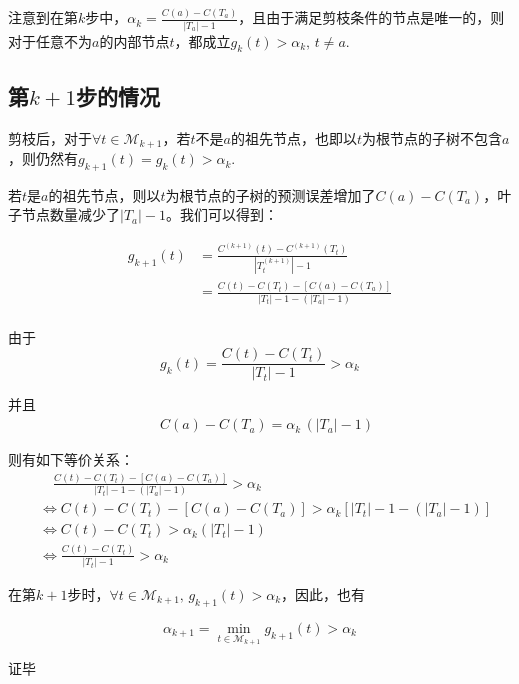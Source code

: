 \documentclass[
]{ctexart}
\begin{document}
注意到在第\(k\)步中，\(\alpha_k = \frac{C(a)-C(T_a)}{|T_a|-1}\)，且由于满足剪枝条件的节点是唯一的，则对于任意不为\(a\)的内部节点\(t\)，都成立\(g_k(t)>\alpha_k,\,t\ne a\).

\hypertarget{ux7b2ck1ux6b65ux7684ux60c5ux51b5}{%
\subsection{\texorpdfstring{第\(k+1\)步的情况}{第k+1步的情况}}\label{ux7b2ck1ux6b65ux7684ux60c5ux51b5}}

剪枝后，对于\(\forall t \in \mathcal{M}_{k+1}\)，若\(t\)不是\(a\)的祖先节点，也即以\(t\)为根节点的子树不包含\(a\)，则仍然有\(g_{k+1}(t) = g_k(t)>\alpha_k\).

若\(t\)是\(a\)的祖先节点，则以\(t\)为根节点的子树的预测误差增加了\(C(a)-C(T_a)\)，叶子节点数量减少了\(|T_a|-1\)。我们可以得到：

\begin{align*}
g_{k+1}(t) &= \frac{C^{(k+1)} (t) - C^{(k+1)}(T_t)}{|T_t^{(k+1)}|-1} \\
&= \frac{C(t) - C(T_t) - [ C(a)-C(T_a)]}{|T_t|-1 - (|T_a|-1)}\\
\end{align*}

由于 \[
g_k(t) = \frac{C(t)-C(T_t)}{|T_t|-1} > \alpha_k
\]

并且 \begin{align*}
 \quad C(a)-C(T_a) = \alpha_k \,\left(|T_a|-1\right) 
\end{align*}

则有如下等价关系： \begin{align*}
 &\quad \frac{C(t) - C(T_t) - [ C(a)-C(T_a)]}{|T_t|-1 - (|T_a|-1)} > \alpha_k \\
 &\Leftrightarrow  C(t) - C(T_t) - [ C(a)-C(T_a)] > \alpha_k [|T_t|-1 -(|T_a|-1)] \\
 & \Leftrightarrow   C(t) - C(T_t) > \alpha_k (|T_t|-1) \\
 & \Leftrightarrow \frac{C(t)-C(T_t)}{|T_t|-1} > \alpha_k
\end{align*}

在第\(k+1\)步时，\(\forall t \in \mathcal{M}_{k+1},\,g_{k+1}(t)>\alpha_k\)，因此，也有

\begin{equation*}
\alpha_{k+1}= \min_{t  \in  \mathcal{M}_{k+1}}g_{k+1}(t) > \alpha_k 
\end{equation*}

证毕
\end{document}
